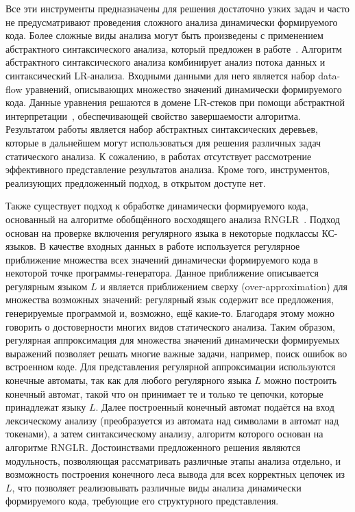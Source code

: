 Все эти инструменты предназначены для решения достаточно узких задач и часто не предусматривают проведения сложного анализа динамически формируемого кода. Более сложные виды анализа могут быть произведены с применением абстрактного синтаксического анализа, который предложен в работе~\cite{LrAbstract2}. Алгоритм абстрактного синтаксического анализа комбинирует анализ потока данных и синтаксический LR-анализа. Входными данными для него является набор data-flow уравнений, описывающих множество значений динамически формируемого кода. Данные уравнения решаются в домене LR-стеков при помощи абстрактной интерпретации~\cite{AbstractInterpretation}, обеспечивающей свойство завершаемости алгоритма. Результатом работы является набор абстрактных синтаксических деревьев, которые в дальнейшем могут использоваться для решения различных задач статического анализа. К сожалению, в работах отсутствует рассмотрение эффективного представление результатов анализа. Кроме того, инструментов, реализующих предложенный подход, в открытом доступе нет.

Также существует подход к обработке динамически формируемого кода,  основанный на алгоритме обобщённого восходящего анализа RNGLR~\cite{RelaxedARNGLR}. Подход основан на проверке включения регулярного языка в некоторые подклассы КС-языков. В качестве входных данных в работе используется регулярное приближение множества всех значений динамически формируемого кода в некоторой точке программы-генератора. Данное приближение описывается регулярным языком $L$ и является приближением сверху (over-approximation) для множества возможных значений: регулярный язык содержит все предложения, генерируемые программой и, возможно, ещё какие-то. Благодаря этому можно говорить о достоверности многих видов статического анализа. Таким образом, регулярная аппроксимация для множества значений динамически формируемых выражений позволяет решать многие важные задачи, например, поиск ошибок во встроенном коде. Для представления регулярной аппроксимации используются конечные автоматы, так как для любого регулярного языка $L$ можно построить конечный автомат, такой что он принимает те и только те цепочки, которые принадлежат языку $L$. Далее построенный конечный автомат подаётся на вход лексическому анализу (преобразуется из автомата над символами в автомат над токенами), а затем синтаксическому анализу, алгоритм которого основан на алгоритме RNGLR. Достоинствами предложенного решения являются модульность, позволяющая рассматривать различные этапы анализа отдельно, и возможность построения конечного леса вывода для всех корректных цепочек из $L$, что позволяет реализовывать различные виды анализа динамически формируемого кода, требующие его структурного представления.

